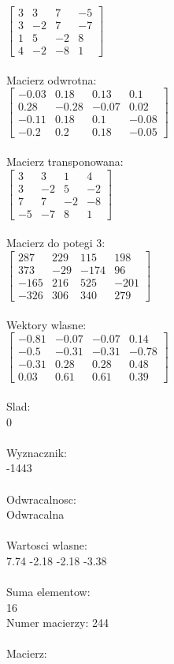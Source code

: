 \documentclass[a4paper,12pt]{article}
\begin{document}
$\begin{bmatrix} 3&3&7&-5\\3&-2&7&-7\\1&5&-2&8\\4&-2&-8&1 \end{bmatrix}$
\\
\\
Macierz odwrotna:\\

$\begin{bmatrix} -0.03&0.18&0.13&0.1\\0.28&-0.28&-0.07&0.02\\-0.11&0.18&0.1&-0.08\\-0.2&0.2&0.18&-0.05 \end{bmatrix}$
\\
\\
Macierz transponowana:\\

$\begin{bmatrix} 3&3&1&4\\3&-2&5&-2\\7&7&-2&-8\\-5&-7&8&1 \end{bmatrix}$
\\
\\
Macierz do potegi 3:\\

$\begin{bmatrix} 287&229&115&198\\373&-29&-174&96\\-165&216&525&-201\\-326&306&340&279 \end{bmatrix}$
\\
\\
Wektory wlasne:\\

$\begin{bmatrix} -0.81&-0.07&-0.07&0.14\\-0.5&-0.31&-0.31&-0.78\\-0.31&0.28&0.28&0.48\\0.03&0.61&0.61&0.39 \end{bmatrix}$
\\
\\
Slad:\\
0
\\
\\
Wyznacznik:\\
-1443
\\
\\
Odwracalnosc:\\
Odwracalna
\\
\\
Wartosci wlasne:\\
7.74 -2.18 -2.18 -3.38
\\
\\
Suma elementow:\\
16
\\
\newpage
Numer macierzy:
244
\\
\\
Macierz:\\
\end{document}
